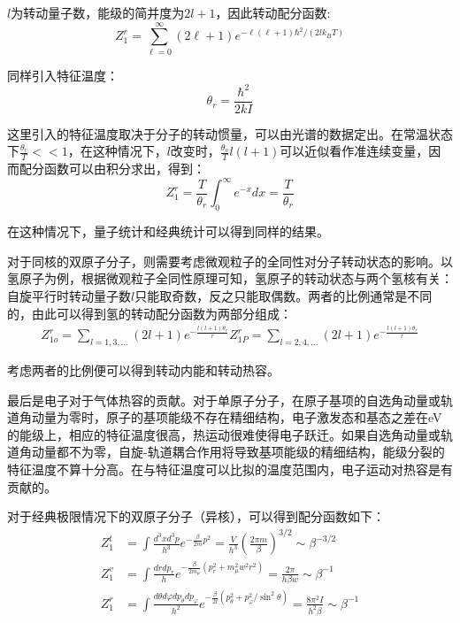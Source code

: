\documentclass[UTF8]{ctexart}
\begin{document}
\noindent $ l $为转动量子数，能级的简并度为$ 2l+1 $，因此转动配分函数:
	\begin{equation}
	Z_{1}^{r}=\sum_{\ell=0}^{\infty}(2 \ell+1) e^{-\ell(\ell+1) \hbar^{2} /\left(2 l k_{B} T\right)}
	\end{equation}
	
\noindent 同样引入特征温度：
	\begin{equation}
		\theta_{r}=\frac{\hbar^{2}}{2 k I}
	\end{equation}
	
	这里引入的特征温度取决于分子的转动惯量，可以由光谱的数据定出。在常温状态下$ \frac{\theta_{r}}{T}<<1 $，在这种情况下，$ l $改变时，$ \frac{\theta_{v}}{T}l(l+1) $可以近似看作准连续变量，因而配分函数可以由积分求出，得到：
	\begin{equation}
	Z_{1}^{r}=\frac{T}{\theta_{r}} \int_{0}^{\infty} e^{-x} d x=\frac{T}{\theta_{r}}
	\end{equation}
	
\noindent 在这种情况下，量子统计和经典统计可以得到同样的结果。

	对于同核的双原子分子，则需要考虑微观粒子的全同性对分子转动状态的影响。以氢原子为例，根据微观粒子全同性原理可知，氢原子的转动状态与两个氢核有关：自旋平行时转动量子数$ l $只能取奇数，反之只能取偶数。两者的比例通常是不同的，由此可以得到氢的转动配分函数为两部分组成：
	\begin{equation}
	\begin{aligned}
	Z_{1o}^{r}=\sum_{l=1,3,...} (2l+1)e^{-\frac{l(l+1)\theta_{r}}{r}}
	Z_{1P}^{r}=\sum_{l=2,4,...} (2l+1)e^{-\frac{l(l+1)\theta_{r}}{r}}
	\end{aligned}
	\end{equation}

\noindent 考虑两者的比例便可以得到转动内能和转动热容。

	最后是电子对于气体热容的贡献。对于单原子分子，在原子基项的自选角动量或轨道角动量为零时，原子的基项能级不存在精细结构，电子激发态和基态之差在eV的能级上，相应的特征温度很高，热运动很难使得电子跃迁。如果自选角动量或轨道角动量都不为零，自旋-轨道耦合作用将导致基项能级的精细结构，能级分裂的特征温度不算十分高。在与特征温度可以比拟的温度范围内，电子运动对热容是有贡献的。

	对于经典极限情况下的双原子分子（异核），可以得到配分函数如下：
	\begin{equation}
	\begin{aligned}
	Z_{1}^{t}&=\int \frac{d^{3} x d^{3} p}{h^{3}} e^{-\frac{\beta}{2 m} p^{2}}=\frac{V}{h^{3}}\left(\frac{2 \pi m}{\beta}\right)^{3 / 2} \sim \beta^{-3 / 2}\\
Z_{1}^{v}&=\int \frac{d r d p_{r}}{h} e^{-\frac{\beta}{2 m_{\mu}}\left(p_{r}^{2}+m_{\mu}^{2} w^{2} r^{2}\right)}=\frac{2 \pi}{h \beta w} \sim \beta^{-1}\\
Z_{1}^{r}&=\int \frac{d \theta d \varphi d p_{\theta} d p_{\varphi}}{h^{2}} e^{-\frac{\beta}{2 l}\left(p_{\theta}^{2}+p_{\varphi}^{2} / \sin ^{2} \theta\right)}=\frac{8 \pi^{2} I}{h^{2} \beta} \sim \beta^{-1}
	\end{aligned}
	\end{equation}
\end{document}
